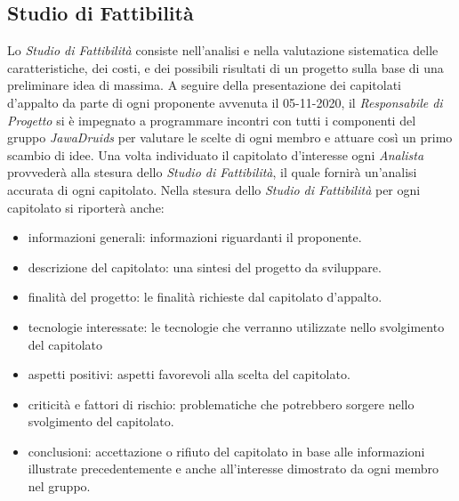 \subsection{Studio di Fattibilità}
Lo \emph{Studio di Fattibilità} consiste nell'analisi e nella valutazione sistematica delle caratteristiche, dei costi, e dei possibili risultati di un progetto sulla base di una preliminare idea di massima.
A seguire della presentazione dei capitolati d'appalto da parte di ogni proponente avvenuta il 05-11-2020, il \emph{Responsabile di Progetto} si è impegnato a programmare incontri con tutti i componenti del gruppo \emph{JawaDruids} per valutare le scelte di ogni membro e attuare così un primo scambio di idee. Una volta individuato il capitolato d'interesse ogni \emph{Analista} provvederà alla stesura dello \emph{Studio di Fattibilità}, il quale fornirà un'analisi accurata di ogni capitolato.
Nella stesura dello \emph{Studio di Fattibilità} per ogni capitolato si riporterà anche:
\begin{itemize}
	\item informazioni generali: informazioni riguardanti il proponente.
	\item descrizione del capitolato: una sintesi del progetto da sviluppare. 
	\item finalità del progetto: le finalità richieste dal capitolato d'appalto.
	\item tecnologie interessate: le tecnologie che verranno utilizzate nello svolgimento del capitolato
	\item aspetti positivi: aspetti favorevoli alla scelta del capitolato.
	\item criticità e fattori di rischio: problematiche che potrebbero sorgere nello svolgimento del capitolato.
	\item conclusioni: accettazione o rifiuto del capitolato in base alle informazioni illustrate precedentemente e anche all'interesse dimostrato da ogni membro nel gruppo.
\end{itemize}
